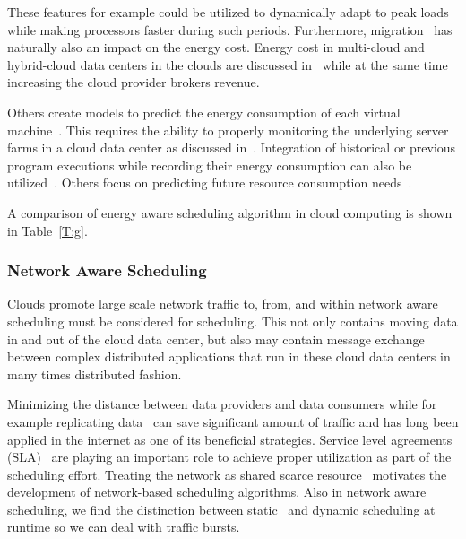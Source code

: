 \documentclass[final,5p,times,twocolumn]{elsarticle}
\begin{document}
These features for example could be utilized to dynamically adapt to
peak loads~\cite{duan2016energy} while making processors faster during
such periods.  Furthermore, migration~\cite{beloglazov2010energy} has
naturally also an impact on the energy cost.  Energy cost in
multi-cloud and hybrid-cloud data centers in the clouds are discussed
in~\cite{quarati2013hybrid,garg2011environment,gai2016dynamic,2015energy} while
at the same time increasing the cloud provider brokers revenue.


Others create models to predict the energy consumption of each virtual
machine~\cite{kim2014energy}. This requires the ability to properly
monitoring the underlying server farms in a cloud data center as
discussed in~\cite{van2012comparison}. Integration of historical or
previous program executions while recording their energy consumption
can also be utilized~\cite{hu2010scheduling}. Others focus on
predicting future resource consumption needs~\cite{dabbagh2015energy}.

A comparison of energy aware scheduling algorithm in cloud computing is shown in
Table~\ref{T:g}.





\subsubsection{Network Aware Scheduling}\label{sec:network}


Clouds promote large scale network traffic to, from, and within
network aware scheduling must be considered for scheduling.  This not
only contains moving data in and out of the cloud data center, but
also may contain message exchange between complex distributed
applications that run in these cloud data centers in many times
distributed fashion.

Minimizing the distance between data providers and data
consumers while for example replicating data~\cite{www-akamai} can save
significant amount of traffic and has long been applied in the
internet as one of its beneficial strategies. Service level agreements
(SLA)~\cite{breitgand2012improving} are playing an important role to
achieve proper utilization as part of the scheduling effort. Treating
the network as shared scarce resource~\cite{rampersaud2016sharing}
motivates the development of network-based scheduling algorithms.
Also in network aware scheduling, we find the
distinction between static~\cite{biran2012stable} and dynamic
scheduling at runtime so we can deal with traffic bursts.
\end{document}
